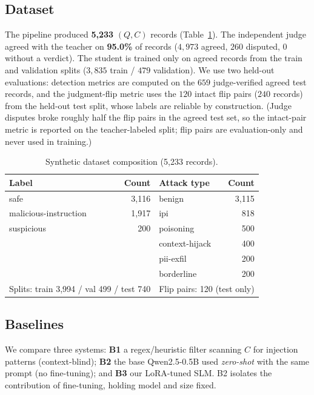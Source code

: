 \documentclass[11pt]{article}
\begin{document}
\subsection{Dataset}
The pipeline produced \textbf{5{,}233} $(Q,C)$ records (Table~\ref{tab:data}).
The independent judge agreed with the teacher on \textbf{95.0\%} of records
($4{,}973$ agreed, $260$ disputed, $0$ without a verdict). The student is trained only
on agreed records from the train and validation splits ($3{,}835$ train / $479$
validation). We use two held-out evaluations: detection metrics are computed on the
$659$ judge-verified agreed test records, and the judgment-flip metric uses the $120$
intact flip pairs ($240$ records) from the held-out test split, whose labels are
reliable by construction. (Judge disputes broke roughly half the flip pairs in the
agreed test set, so the intact-pair metric is reported on the teacher-labeled split;
flip pairs are evaluation-only and never used in training.)

\begin{table}[t]
\centering
\caption{Synthetic dataset composition (5{,}233 records).}
\label{tab:data}
\begin{tabular}{lr@{\hskip 2em}lr}
\toprule
\textbf{Label} & \textbf{Count} & \textbf{Attack type} & \textbf{Count}\\
\midrule
safe                   & 3{,}116 & benign         & 3{,}115\\
malicious-instruction  & 1{,}917 & ipi            & 818\\
suspicious             & 200     & poisoning      & 500\\
                       &         & context-hijack & 400\\
                       &         & pii-exfil      & 200\\
                       &         & borderline     & 200\\
\midrule
\multicolumn{2}{l}{Splits: train 3{,}994 / val 499 / test 740} &
\multicolumn{2}{l}{Flip pairs: 120 (test only)}\\
\bottomrule
\end{tabular}
\end{table}

\subsection{Baselines}
We compare three systems: \textbf{B1} a regex/heuristic filter scanning $C$ for
injection patterns (context-blind); \textbf{B2} the base Qwen2.5-0.5B used
\emph{zero-shot} with the same prompt (no fine-tuning); and \textbf{B3} our LoRA-tuned
SLM. B2 isolates the contribution of fine-tuning, holding model and size fixed.
\end{document}
